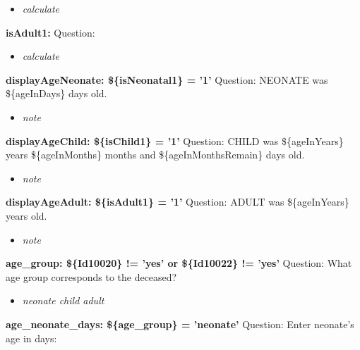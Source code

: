 \documentclass{article}%
\begin{document}
%
\begin{itemize}%
\item%
\textit{calculate\newline%
}%
\end{itemize}%
\textbf{isAdult1: \newline%
}%
Question: \newline%
%
\begin{itemize}%
\item%
\textit{calculate\newline%
}%
\end{itemize}%
\textbf{displayAgeNeonate: \$\{isNeonatal1\} = '1'\newline%
}%
Question: NEONATE was \$\{ageInDays\} days old.\newline%
%
\begin{itemize}%
\item%
\textit{note\newline%
}%
\end{itemize}%
\textbf{displayAgeChild: \$\{isChild1\} = '1'\newline%
}%
Question: CHILD was \$\{ageInYears\} years \$\{ageInMonths\} months and \$\{ageInMonthsRemain\} days old.\newline%
%
\begin{itemize}%
\item%
\textit{note\newline%
}%
\end{itemize}%
\textbf{displayAgeAdult: \$\{isAdult1\} = '1'\newline%
}%
Question: ADULT was \$\{ageInYears\} years old.\newline%
%
\begin{itemize}%
\item%
\textit{note\newline%
}%
\end{itemize}%
\textbf{age\_group: \$\{Id10020\} != 'yes' or \$\{Id10022\} != 'yes'\newline%
}%
Question: What age group corresponds to the deceased?\newline%
%
\begin{itemize}%
\item%
\textit{neonate\newline%
 child\newline%
 adult\newline%
}%
\end{itemize}%
\textbf{age\_neonate\_days: \$\{age\_group\} = 'neonate'\newline%
}%
Question: Enter neonate's age in days:\newline%
\end{document}
